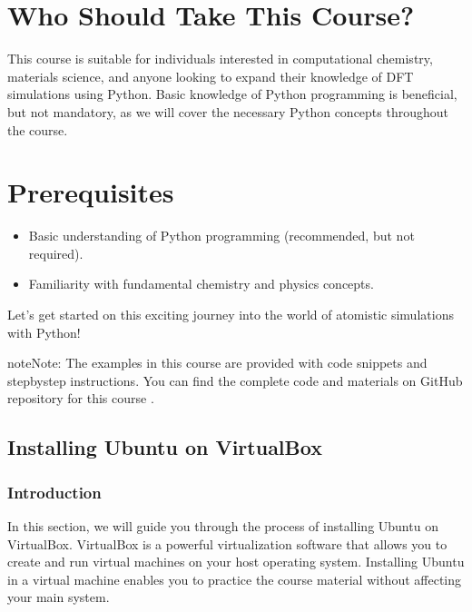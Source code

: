 \documentclass[letterpaper,10pt,english]{sphinxmanual}
\begin{document}
\section{Who Should Take This Course?}
\label{\detokenize{index:who-should-take-this-course}}
\sphinxAtStartPar
This course is suitable for individuals interested in computational chemistry, materials science, and anyone looking to expand their knowledge of DFT simulations using Python. Basic knowledge of Python programming is beneficial, but not mandatory, as we will cover the necessary Python concepts throughout the course.


\section{Prerequisites}
\label{\detokenize{index:prerequisites}}\begin{itemize}
\item {} 
\sphinxAtStartPar
Basic understanding of Python programming (recommended, but not required).

\item {} 
\sphinxAtStartPar
Familiarity with fundamental chemistry and physics concepts.

\end{itemize}

\sphinxAtStartPar
Let’s get started on this exciting journey into the world of atomistic simulations with Python!

\begin{sphinxadmonition}{note}{Note:}
\sphinxAtStartPar
The examples in this course are provided with code snippets and step\sphinxhyphen{}by\sphinxhyphen{}step instructions. You can find the complete code and materials on GitHub repository for this course  .
\end{sphinxadmonition}

\sphinxstepscope


\subsection{Installing Ubuntu on VirtualBox}
\label{\detokenize{vbox/vbox:installing-ubuntu-on-virtualbox}}\label{\detokenize{vbox/vbox::doc}}

\subsubsection{Introduction}
\label{\detokenize{vbox/vbox:introduction}}
\sphinxAtStartPar
In this section, we will guide you through the process of installing Ubuntu on VirtualBox. VirtualBox is a powerful virtualization software that allows you to create and run virtual machines on your host operating system. Installing Ubuntu in a virtual machine enables you to practice the course material without affecting your main system.
\end{document}
